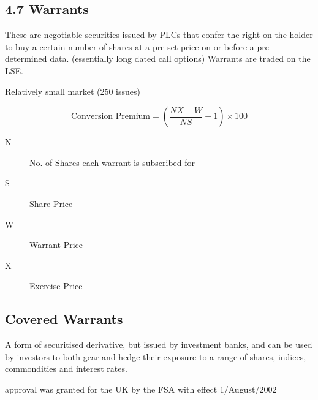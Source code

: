 \subsection{4.7 Warrants}

These are negotiable securities issued by PLCs that confer the right on the holder to buy a certain number of shares at a pre-set price on or before a 
pre-determined data. (essentially long dated call options)
Warrants are traded on the LSE.

Relatively small market (250 issues)

\[

\mbox{Conversion Premium} = \left(\frac{NX+W}{NS} - 1 \right)\times 100

\]

\begin{description}
\item[N] No. of Shares each warrant is subscribed for
\item[S] Share Price
\item[W] Warrant Price
\item[X] Exercise Price
\end{description}

\subsection{Covered Warrants}
A form of securitised derivative, but issued by investment banks, and can be used by investors to both gear and hedge their exposure
to a range of shares, indices, commondities and interest rates.

approval was granted for the UK by the FSA with effect 1/August/2002
